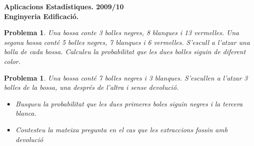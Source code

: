 \documentclass[11pt]{article}
\newcounter{prbcont}
\newtheorem{problema}[prbcont]{Problema}
\begin{document}
\begin{center}
\textbf{{\large {Aplicacions Estad\'{i}stiques. 2009/10}\\}}
\vspace{0.5cm}
\textbf{Enginyeria Edificaci\'o.}
\end{center}

\begin{problema}
Una bossa conte 3 bolles negres, 8 blanques i 13 vermelles. Una segona bossa cont\'e 5 bolles negres, 7 blanques i 6 vermelles. S'escull a l'atzar una bolla de cada bossa. Calculeu la probabilitat que les dues bolles siguin de diferent color.
\end{problema}



\begin{problema}
Una bossa cont\'e 7 bolles negres i 3 blanques. S'escullen a l'atzar 3 bolles de la bossa, una despr\'es de l'altra i sense devoluci\'o. 
\begin{itemize}
\item Busqueu la probabilitat que les dues primeres boles siguin negres i la tercera blanca.
\item Contesteu la mateixa pregunta en el cas que les extraccions fossin amb devoluci\'o
\end{itemize}
\end{problema}
\end{document}
